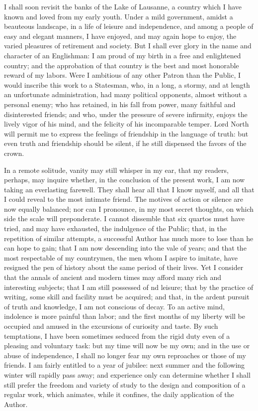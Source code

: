 I shall soon revisit the banks of the Lake of Lausanne, a country which I
have known and loved from my early youth. Under a mild government, amidst a
beauteous landscape, in a life of leisure and independence, and among a people
of easy and elegant manners, I have enjoyed, and may again hope to enjoy, the
varied pleasures of retirement and society. But I shall ever glory in the
name and character of an Englishman: I am proud of my birth in a free and
enlightened country; and the approbation of that country is the best and
most honorable reward of my labors. Were I ambitious of any other Patron than
the Public, I would inscribe this work to a Statesman, who, in a long, a stormy,
and at length an unfortunate administration, had many political opponents,
almost without a personal enemy; who has retained, in his fall from power,
many faithful and disinterested friends; and who, under the pressure of severe
infirmity, enjoys the lively vigor of his mind, and the felicity of his
incomparable temper. Lord North will permit me to express the feelings of
friendship in the language of truth: but even truth and friendship should be
silent, if he still dispensed the favors of the crown.

In a remote solitude, vanity may still whisper in my ear, that my readers,
perhaps, may inquire whether, in the conclusion of the present work, I am now
taking an everlasting farewell. They shall hear all that I know myself, and
all that I could reveal to the most intimate friend. The motives of action
or silence are now equally balanced; nor can I pronounce, in my most secret
thoughts, on which side the scale will preponderate. I cannot dissemble that
six quartos must have tried, and may have exhausted, the indulgence of the
Public; that, in the repetition of similar attempts, a successful Author has
much more to lose than he can hope to gain; that I am now descending into the
vale of years; and that the most respectable of my countrymen, the men whom
I aspire to imitate, have resigned the pen of history about the same period
of their lives. Yet I consider that the annals of ancient and modern times
may afford many rich and interesting subjects; that I am still possessed of
nd leisure; that by the practice of writing, some skill and facility must be
acquired; and that, in the ardent pursuit of truth and knowledge, I am not
conscious of decay. To an active mind, indolence is more painful than labor;
and the first months of my liberty will be occupied and amused in the excursions
of curiosity and taste. By such temptations, I have been sometimes seduced
from the rigid duty even of a pleasing and voluntary task: but my time will
now be my own; and in the use or abuse of independence, I shall no longer
fear my own reproaches or those of my friends. I am fairly entitled to a year
of jubilee: next summer and the following winter will rapidly pass away; and
experience only can determine whether I shall still prefer the freedom and
variety of study to the design and composition of a regular work, which
animates, while it confines, the daily application of the Author.

